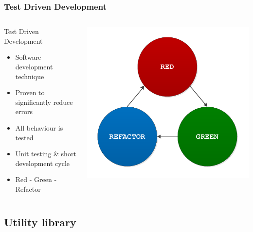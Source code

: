 \documentclass[british,10pt]{beamer}
\begin{document}
\begin{frame}\frametitle{Test Driven Development}
\begin{columns}
\begin{column}{0.6\textwidth}
Test Driven Development
\begin{itemize}
\item Software development technique
\item Proven to significantly reduce errors
\item All behaviour is tested
\item Unit testing \& short development cycle
\item Red - Green - Refactor
\end{itemize}
\end{column}
\includegraphics[width=\textwidth]{images/tdd.pdf}
\end{columns}
\end{frame}


\subsection{Utility library}
\end{document}
